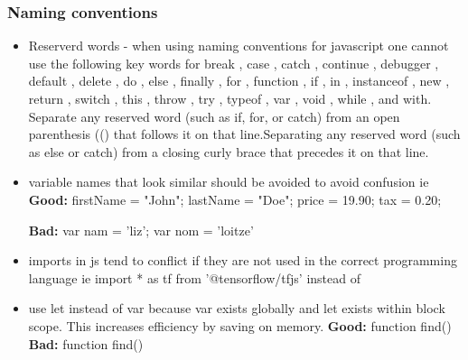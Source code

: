 \documentclass[10pt]{article}
\begin{document}
	    \subsubsection{Naming conventions}
	    \begin{itemize}
	         \item Reserverd words - when using naming conventions for javascript one cannot use the following key words for  break , case , catch , continue , debugger , default , delete , do , else , finally , for , function , if , in , instanceof , new , return , switch , this , throw , try , typeof , var , void , while , and with. Separate any reserved word (such as if, for, or catch) from an open parenthesis (() that follows it on that line.Separating any reserved word (such as else or catch) from a closing curly brace  that precedes it on that line.
        \newline
	    
	        \item variable names that look similar should be avoided to avoid confusion ie
	        \newline
	        \textbf{Good:}
    	   \newline firstName = "John";
    	   \newline lastName = "Doe";
           \newline price = 19.90;
           \newline tax = 0.20;
           \newline
                 
	        \textbf{Bad:}
	        \newline var nam = 'liz';
	        \newline var nom = 'loitze'
	        \item imports in js tend to conflict if they are not used in the correct programming language ie import * as tf from '@tensorflow/tfjs' instead of
	        \newline
	        
	        \item use let instead of var because var exists globally and let exists  within block scope. This increases efficiency by saving on memory.
        \newline
	        \textbf{Good:}
	        \newline function find()
	        \textbf{Bad:}
	        \newline function find()
	        \newline 
	        

\end{itemize}
\end{document}
